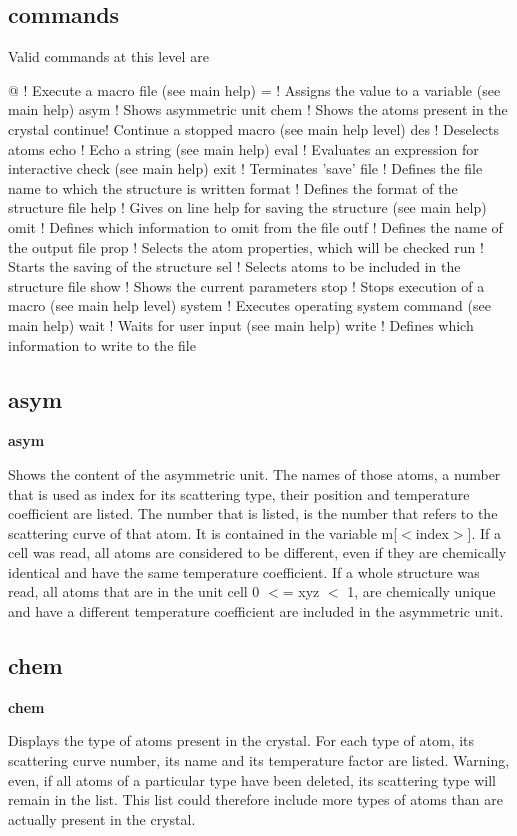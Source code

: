 \subsection*{commands}
Valid commands at this level are 
\par
\begin{MacVerbatim}
@       ! Execute a macro file (see main help)
=       ! Assigns the value to a variable (see main help)
asym    ! Shows asymmetric unit
chem    ! Shows the atoms present in the crystal
continue! Continue a stopped macro (see main help level)
des     ! Deselects atoms
echo    ! Echo a string (see main help)
eval    ! Evaluates an expression for interactive check (see main help)
exit    ! Terminates 'save'
file    ! Defines the file name to which the structure is written
format  ! Defines the format of the structure file
help    ! Gives on line help for saving the structure (see main help)
omit    ! Defines which information to omit from the file
outf    ! Defines the name of the output file
prop    ! Selects the atom properties, which will be checked
run     ! Starts the saving of the structure
sel     ! Selects atoms to be included in the structure file
show    ! Shows the current parameters
stop    ! Stops execution of a macro (see main help level)
system  ! Executes operating system command (see main help)
wait    ! Waits for user input (see main help)
write   ! Defines which information to write to the file
\end{MacVerbatim}
\subsection*{asym}
{\bf asym \par }
\par
\vspace{3pt}
Shows the content of the asymmetric unit. The names of those atoms, 
a number that is used as index for its scattering type, their position 
and temperature coefficient are listed. The number that is listed, 
is the number that refers to the scattering curve of that atom. It is 
contained in the variable m[$ <$index$> $]. If a cell was read, all atoms 
are considered to be different, even if they are chemically identical 
and have the same temperature coefficient. If a whole structure was 
read, all atoms that are in the unit cell 0 $ <$= xyz $ <$ 1, are chemically 
unique and have a different temperature coefficient are included in 
the asymmetric unit. 
\subsection*{chem}
{\bf chem \par }
\par
\vspace{3pt}
Displays the type of atoms present in the crystal. For each type of 
atom, its scattering curve number, its name and its temperature 
factor are listed. 
Warning, even, if all atoms of a particular type have been deleted, its 
scattering type will remain in the list. This list could therefore 
include more types of atoms than are actually present in the crystal. 
